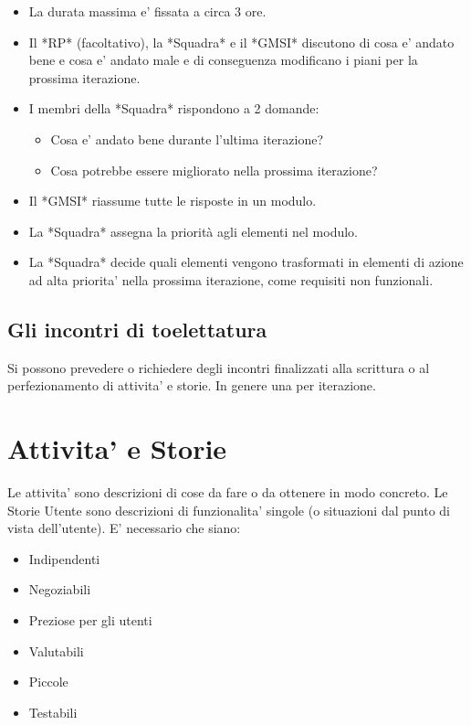 \begin{itemize}
  \item La durata massima e' fissata a circa 3 ore.
  \item Il *RP* (facoltativo), la *Squadra* e il *GMSI* discutono di cosa e' andato bene e cosa e' andato male e di conseguenza modificano i piani per la prossima iterazione.
  \item I membri della *Squadra* rispondono a 2 domande:
  \begin{itemize}
    \item Cosa e' andato bene durante l'ultima iterazione?
    \item Cosa potrebbe essere migliorato nella prossima iterazione?
  \end{itemize}
  \item Il *GMSI* riassume tutte le risposte in un modulo.
  \item La *Squadra* assegna la priorità agli elementi nel modulo.
  \item La *Squadra* decide quali elementi vengono trasformati in elementi di azione ad alta priorita' nella prossima iterazione, come requisiti non funzionali.
\end{itemize}

\subsection{Gli incontri di toelettatura}

Si possono prevedere o richiedere degli incontri finalizzati alla scrittura o al perfezionamento di attivita' e storie. In genere una per iterazione.

\section{Attivita' e Storie}

Le attivita' sono descrizioni di cose da fare o da ottenere in modo concreto.
Le Storie Utente sono descrizioni di funzionalita' singole (o situazioni dal punto di vista dell'utente). E' necessario che siano:
\begin{itemize}
  \item Indipendenti
  \item Negoziabili
  \item Preziose per gli utenti
  \item Valutabili
  \item Piccole
  \item Testabili
\end{itemize}


